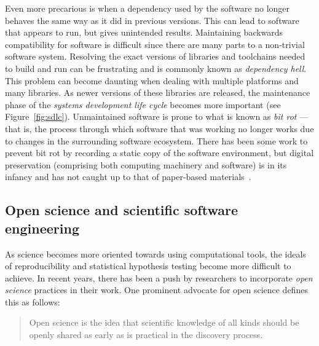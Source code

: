 { %
	Even more precarious is when a dependency used by the
	software no longer behaves the same way as it did in
	previous versions. This can lead to software that appears
	to run, but gives unintended results. Maintaining
	backwards compatibility for software is difficult since
	there are many parts to a non-trivial software system.
	Resolving the exact versions of libraries and toolchains
	needed to build and run can be frustrating and is commonly
	known as \emph{dependency hell}. This problem can become
	daunting when dealing with multiple platforms and many
	libraries. As newer versions of these libraries are
	released, the maintenance phase of the \emph{systems
	development life cycle} becomes more important (see Figure~\ref{fig:sdlc}).
	Unmaintained software is prone to what is known as
	\emph{bit rot} --- that is, the process through which
	software that was working no longer works due to changes
	in the surrounding software ecosystem.
	There has been some work to prevent bit rot by recording a
	static copy of the software environment, but digital
	preservation (comprising both computing machinery and
	software) is in its infancy and has not caught up to that
	of paper-based materials~\autocite{PreservingExe2013,Thain2015,Meng2015}.
}


\subsection{Open science and scientific software engineering}\label{subsec:open-science}

As science becomes more oriented towards using computational
tools, the ideals of reproducibility and statistical hypothesis
testing become more difficult to achieve. In recent years, there
has been a push by researchers to incorporate \emph{open science}
practices in their work. One prominent advocate for open science
defines this as follows:\\
\parbox{\textwidth}{
\begin{quote}
	\begin{fancyquote}
	Open science is the idea that scientific knowledge of all kinds
	should be openly shared as early as is practical in the discovery
	process.
	\end{fancyquote}
\end{quote}
}

